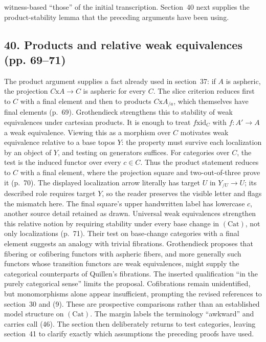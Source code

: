 \documentclass[10pt,oneside]{book}
\begin{document}
witness-based ``those'' of the initial transcription. Section~40 next supplies the product-stability lemma that the preceding arguments have been using.

\subsection*{40. Products and relative weak equivalences (pp. 69--71)}
The product argument supplies a fact already used in section~37: if $A$ is aspheric, the projection $C\mathrm{x}A\to C$ is aspheric for every $C$. The slice criterion reduces first to $C$ with a final element and then to products $C\mathrm{x}A_{/a}$, which themselves have final elements (p.~69). Grothendieck strengthens this to stability of weak equivalences under cartesian products. It is enough to treat $f\mathrm{x}\mathrm{id}_C$ with $f:A'\to A$ a weak equivalence. Viewing this as a morphism over $C$ motivates weak equivalence relative to a base topos $Y$: the property must survive each localization by an object of $Y$, and testing on generators suffices. For categories over $C$, the test is the induced functor over every $c\in C$. Thus the product statement reduces to $C$ with a final element, where the projection square and two-out-of-three prove it (p.~70). The displayed localization arrow literally has target $U$ in $Y_{/U}\to U$; its described role requires target $Y$, so the reader preserves the visible letter and flags the mismatch here. The final square's upper handwritten label has lowercase $c$, another source detail retained as drawn. Universal weak equivalences strengthen this relative notion by requiring stability under every base change in $(\mathrm{Cat})$, not only localizations (p.~71). Their test on base-change categories with a final element suggests an analogy with trivial fibrations. Grothendieck proposes that fibering or cofibering functors with aspheric fibers, and more generally such functors whose transition functors are weak equivalences, might supply the categorical counterparts of Quillen's fibrations. The inserted qualification ``in the purely categorical sense'' limits the proposal. Cofibrations remain unidentified, but monomorphisms alone appear insufficient, prompting the revised references to section~30 and (9). These are prospective comparisons rather than an established model structure on $(\mathrm{Cat})$. The margin labels the terminology ``awkward'' and carries call (46). The section then deliberately returns to test categories, leaving section~41 to clarify exactly which assumptions the preceding proofs have used.
\end{document}
